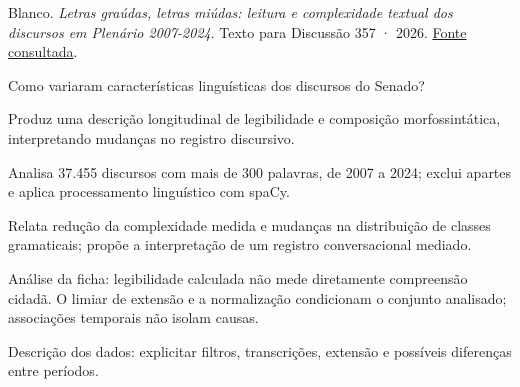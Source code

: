 {\small Blanco. \textit{Letras gra{\'u}das, letras mi{\'u}das: leitura e complexidade textual dos discursos em Plen{\'a}rio 2007-2024}. Texto para Discussão 357 · 2026. \href{https://www12.senado.leg.br/publicacoes/estudos-legislativos/tipos-de-estudos/textos-para-discussao/td357}{Fonte consultada}.\par}

Como variaram características linguísticas dos discursos do Senado?

Produz uma descrição longitudinal de legibilidade e composição morfossintática, interpretando mudanças no registro discursivo.

Analisa 37.455 discursos com mais de 300 palavras, de 2007 a 2024; exclui apartes e aplica processamento linguístico com spaCy.

Relata redução da complexidade medida e mudanças na distribuição de classes gramaticais; propõe a interpretação de um registro conversacional mediado.

\begin{itemize}
\end{itemize}

Análise da ficha: legibilidade calculada não mede diretamente compreensão cidadã. O limiar de extensão e a normalização condicionam o conjunto analisado; associações temporais não isolam causas.

Descrição dos dados: explicitar filtros, transcrições, extensão e possíveis diferenças entre períodos.

